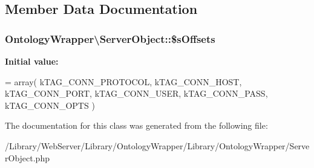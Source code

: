 \subsection{Member Data Documentation}
\hypertarget{class_ontology_wrapper_1_1_server_object_a733e75c9315f054ccf24d9f7b77ebe6c}{
\subsubsection[{\$s\-Offsets}]{\setlength{\rightskip}{0pt plus 5cm}Ontology\-Wrapper\textbackslash{}\-Server\-Object\-::\$s\-Offsets\hspace{0.3cm}{\ttfamily [static]}}}\label{class_ontology_wrapper_1_1_server_object_a733e75c9315f054ccf24d9f7b77ebe6c}
{\bfseries Initial value\-:}
\begin{DoxyCode}
= array( kTAG\_CONN\_PROTOCOL,
                                                          kTAG\_CONN\_HOST, kTAG\_CONN\_PORT,
                                                          kTAG\_CONN\_USER, kTAG\_CONN\_PASS,
                                                          kTAG\_CONN\_OPTS )
\end{DoxyCode}


The documentation for this class was generated from the following file\-:\begin{DoxyCompactItemize}
\item 
/\-Library/\-Web\-Server/\-Library/\-Ontology\-Wrapper/\-Library/\-Ontology\-Wrapper/Server\-Object.\-php\end{DoxyCompactItemize}
